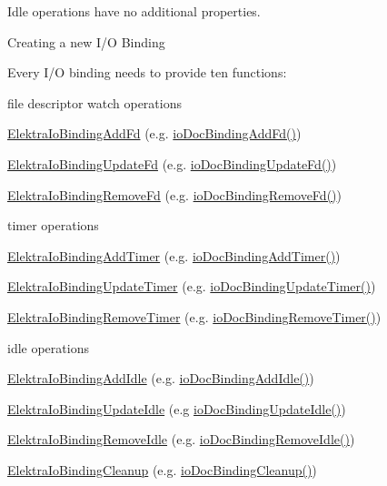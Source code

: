 Idle operations have no additional properties.

\begin{DoxyParagraph}{Creating a new I/O Binding}

\end{DoxyParagraph}
Every I/O binding needs to provide ten functions\+:
\begin{DoxyItemize}
\item file descriptor watch operations
\begin{DoxyItemize}
\item \hyperlink{kdbio_8h_addbfc876a15d0b8864196c67ab3e5a26}{Elektra\+Io\+Binding\+Add\+Fd} (e.\+g. \hyperlink{io__doc_8c_ae9b5f4e891829f3af8563e8160e1bd02}{io\+Doc\+Binding\+Add\+Fd()})
\item \hyperlink{kdbio_8h_acdb75b8df54c2b64980cf541b2704f37}{Elektra\+Io\+Binding\+Update\+Fd} (e.\+g. \hyperlink{io__doc_8c_a172a781f21310745a16cb24c578c4656}{io\+Doc\+Binding\+Update\+Fd()})
\item \hyperlink{kdbio_8h_af1d03ff367130892ec3d1f4788eb8277}{Elektra\+Io\+Binding\+Remove\+Fd} (e.\+g. \hyperlink{io__doc_8c_ac5a985c3d54b2c06838d8af1719fcf09}{io\+Doc\+Binding\+Remove\+Fd()})
\end{DoxyItemize}
\item timer operations
\begin{DoxyItemize}
\item \hyperlink{kdbio_8h_a61a8f37e371b8360c92222f58f4691eb}{Elektra\+Io\+Binding\+Add\+Timer} (e.\+g. \hyperlink{io__doc_8c_a4392a7bfa23513cf4cff7bcf4b0c4c68}{io\+Doc\+Binding\+Add\+Timer()})
\item \hyperlink{kdbio_8h_ab50f6288380aba507d27a0d66e00d8b4}{Elektra\+Io\+Binding\+Update\+Timer} (e.\+g. \hyperlink{io__doc_8c_a1ed16f0e61d2c7c59735b321b7080dec}{io\+Doc\+Binding\+Update\+Timer()})
\item \hyperlink{kdbio_8h_a00c0ffb60386fd65869367280d1ffe62}{Elektra\+Io\+Binding\+Remove\+Timer} (e.\+g. \hyperlink{io__doc_8c_afc27d1f174e30aab500a9e94a366f8ec}{io\+Doc\+Binding\+Remove\+Timer()})
\end{DoxyItemize}
\item idle operations
\begin{DoxyItemize}
\item \hyperlink{kdbio_8h_adcfdf9f514441cabfbfd064fe4021522}{Elektra\+Io\+Binding\+Add\+Idle} (e.\+g. \hyperlink{io__doc_8c_ae7db8c833350176d2570cc4a010c2692}{io\+Doc\+Binding\+Add\+Idle()})
\item \hyperlink{kdbio_8h_af4fa5e05e59022b5d5421932882fc966}{Elektra\+Io\+Binding\+Update\+Idle} (e.\+g \hyperlink{io__doc_8c_a9b8faf0861123676a0a826987962552f}{io\+Doc\+Binding\+Update\+Idle()})
\item \hyperlink{kdbio_8h_a23b523b54e70df91a85c95583b6c958f}{Elektra\+Io\+Binding\+Remove\+Idle} (e.\+g. \hyperlink{io__doc_8c_ad813afce995620df6542c3cdd32b23e6}{io\+Doc\+Binding\+Remove\+Idle()})
\end{DoxyItemize}
\item \hyperlink{kdbio_8h_a08d3ce531bbd1c5acedbdb9822b24d6d}{Elektra\+Io\+Binding\+Cleanup} (e.\+g. \hyperlink{io__doc_8c_a8bfb50f3c81b02ba9f0ad1a2f24afb6d}{io\+Doc\+Binding\+Cleanup()})
\end{DoxyItemize}

